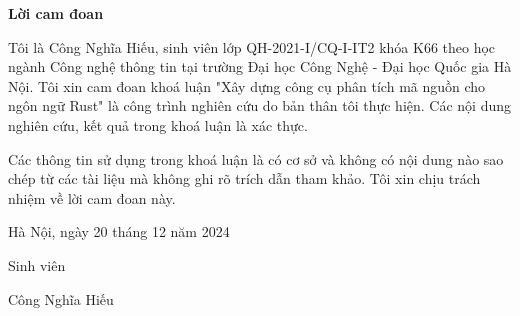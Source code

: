 \setcounter{page}{1}
\begin{center}
\textbf{\large{Lời cam đoan}	}
\end{center}

Tôi là Công Nghĩa Hiếu, sinh viên lớp QH-2021-I/CQ-I-IT2 khóa K66 theo học ngành Công nghệ thông tin tại trường Đại học Công Nghệ - Đại học Quốc gia Hà Nội.
Tôi xin cam đoan khoá luận "Xây dựng công cụ phân tích mã nguồn cho ngôn ngữ Rust" là công trình nghiên cứu do bản thân tôi thực hiện.
Các nội dung nghiên cứu, kết quả trong khoá luận là xác thực.

Các thông tin sử dụng trong khoá luận là có cơ sở và không có nội dung nào sao chép từ các tài liệu mà không ghi rõ trích dẫn tham khảo.
Tôi xin chịu trách nhiệm về lời cam đoan này.

\begin{flushright}
Hà Nội, ngày 20 tháng 12 năm 2024
\end{flushright}

\begin{changemargin}{11.5cm}{2cm}
Sinh viên
\\[2cm]
\end{changemargin}

\begin{changemargin}{11cm}{2cm}
Công Nghĩa Hiếu
\end{changemargin}
